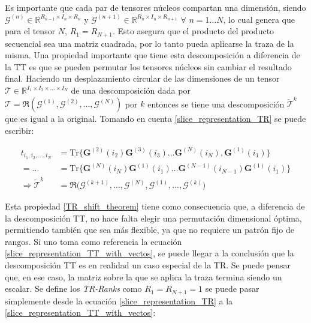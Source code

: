 \documentclass[spanish]{article}
\theoremstyle{definition}
\theoremstyle{remark}
\numberwithin{equation}{section}
\numberwithin{equation}{section} %
\begin{document}
Es importante que cada par de tensores núcleos compartan una dimensión, siendo $\mathcal{G}^{(n)} \in \mathbb{R} ^{R_{n-1}\times I_n \times R_n }$ y $\mathcal{G}^{(n+1)} \in \mathbb{R} ^{R_{n}\times I_n \times R_{n+1} }$ $\forall$ $n=1 \ldots N$, lo cual genera que para el tensor $N$, $R_1=R_{N+1}$. Esto asegura que el producto del producto secuencial sea una matriz cuadrada, por lo tanto pueda aplicarse la traza de la misma.
Una propiedad importante que tiene esta descomposición a diferencia de la TT es que se pueden permutar los tensores núcleos sin cambiar el resultado final. Haciendo un desplazamiento circular de las dimensiones de un tensor  $\mathcal{T} \in \mathbb{R} ^{I_1 \times I_2 \times \ldots \times I_N}$ de una descomposición dada por $\mathcal{T}=\mathfrak{R}(\mathcal{G}^{(1)},\mathcal{G}^{(2)}, \ldots ,\mathcal{G}^{(N)})$ por $k$ entonces se tiene una descomposición $ \overleftarrow{\mathcal{T}}^k$ que es igual a la original. Tomando en cuenta \eqref{slice_representation_TR} se puede escribir:\par 
\begin{equation}
\label{TR_shift_theorem}
\begin{split}
t_{i_1,i_2, \ldots ,i_N}&
= \mathrm{Tr} \Big\{\boldsymbol{G}^{(2)}(i_2)\boldsymbol{G}^{(3)}(i_3) \ldots \boldsymbol{G}^{(N)}(i_N),\boldsymbol{G}^{(1)}(i_1) \Big\}   \\ = \ldots &
= \mathrm{Tr} \Big\{\boldsymbol{G}^{(N)}(i_{N})\boldsymbol{G}^{(1)}(i_1) \ldots \boldsymbol{G}^{(N-1)}(i_{N-1})\boldsymbol{G}^{(1)}(i_1) \Big\} \\
\Rightarrow	\overleftarrow{\mathcal{T}}^k&
=\mathfrak{R}\Big(\mathcal{G}^{(k+1)}, \ldots ,\mathcal{G}^{(N)},\mathcal{G}^{(1)}, \ldots ,\mathcal{G}^{(k)}\Big)
\end{split}
\end{equation} \par
Esta propiedad \eqref{TR_shift_theorem} tiene como consecuencia que, a diferencia de la descomposición TT, no hace falta elegir una permutación dimensional óptima, permitiendo también que sea más flexible, ya que no requiere un patrón fijo de rangos. Si uno toma como referencia la ecuación \eqref{slice_representation_TT_with_vectos}, se puede llegar a la conclusión que la descomposición TT es en realidad un caso especial de la TR. Se puede pensar que, en ese caso, la matriz sobre la que se aplica la traza termina siendo un escalar. Se define los \textit{TR-Ranks} como $R_1 = R_{N+1}=1$ se puede pasar simplemente desde la ecuación \eqref{slice_representation_TR} a la \eqref{slice_representation_TT_with_vectos}: \par
\end{document}
